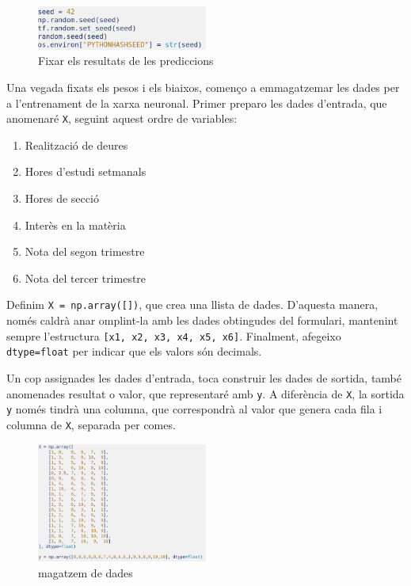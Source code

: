 \begin{figure}[H]
    \centering
    \includegraphics[width=0.5\textwidth]{./figures/22.png}
    \caption{Fixar els resultats de les prediccions}
\end{figure}


Una vegada fixats els pesos i els biaixos, començo a emmagatzemar les dades per a l’entrenament de la xarxa neuronal.
Primer preparo les dades d’entrada, que anomenaré \texttt{X}, seguint aquest ordre de variables:

\begin{enumerate}
    \item Realització de deures
    \item Hores d’estudi setmanals
    \item Hores de secció
    \item Interès en la matèria
    \item Nota del segon trimestre
    \item Nota del tercer trimestre
\end{enumerate}

Definim \texttt{X = np.array([])}, que crea una llista de dades.
D’aquesta manera, només caldrà anar omplint-la amb les dades obtingudes del formulari, mantenint sempre l’estructura
\texttt{[x1, x2, x3, x4, x5, x6]}.
Finalment, afegeixo \texttt{dtype=float} per indicar que els valors són decimals.

Un cop assignades les dades d’entrada, toca construir les dades de sortida, també anomenades resultat o valor, que representaré amb \texttt{y}.
A diferència de \texttt{X}, la sortida \texttt{y} només tindrà una columna, que correspondrà al valor que genera cada fila i columna de \texttt{X}, separada per comes.

\begin{figure}[H]
    \centering
    \includegraphics[width=0.5\textwidth]{./figures/23.png}
    \caption{magatzem de dades}
\end{figure}

